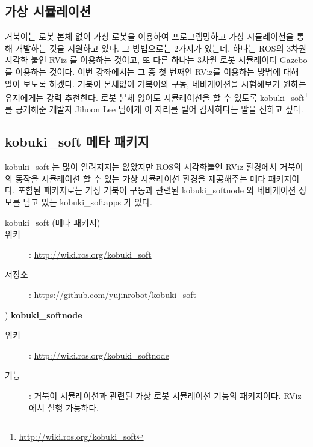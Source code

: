 \subsection{가상 시뮬레이션}

거북이는 로봇 본체 없이 가상 로봇을 이용하여 프로그램밍하고 가상 시뮬레이션을 통해 개발하는 것을 지원하고 있다. 그 방법으로는 2가지가 있는데, 하나는 ROS의 3차원 시각화 툴인 RViz 를 이용하는 것이고, 또 다른 하나는 3차원 로봇 시뮬레이터 Gazebo를 이용하는 것이다. 이번 강좌에서는 그 중 첫 번째인 RViz를 이용하는 방법에 대해 알아 보도록 하겠다. 거북이 본체없이 거북이의 구동, 네비게이션을 시험해보기 원하는 유저에게는 강력 추천한다. 로봇 본체 없이도 시뮬레이션을 할 수 있도록 kobuki\_soft\footnote{\url{http://wiki.ros.org/kobuki_soft}} 를 공개해준 개발자 Jihoon Lee 님에게 이 자리를 빌어 감사하다는 말을 전하고 싶다.

\subsection{kobuki\_soft 메타 패키지}

kobuki\_soft 는 많이 알려지지는 않았지만 ROS의 시각화툴인 RViz 환경에서 거북이의 동작을 시뮬레이션 할 수 있는 가상 시뮬레이션 환경을 제공해주는 메타 패키지이다. 포함된 패키지로는 가상 거북이 구동과 관련된 kobuki\_softnode 와 네비게이션 정보를 담고 있는 kobuki\_softapps 가 있다. 

\vspace{\baselineskip}
\begin{description}
\item[kobuki\_soft (메타 패키지)]
\item[위키]: \url{http://wiki.ros.org/kobuki_soft}
\item[저장소]: \url{https://github.com/yujinrobot/kobuki_soft}
\end{description}

\setcounter{num}{0}

\vspace{\baselineskip}
\noindent{}
\thenum) \textbf{kobuki\_softnode}
\begin{description}
\item[위키]: \url{http://wiki.ros.org/kobuki_softnode}
\item[기능]: 거북이 시뮬레이션과 관련된 가상 로봇 시뮬레이션 기능의 패키지이다. RViz 에서 실행 가능하다.
\end{description}

